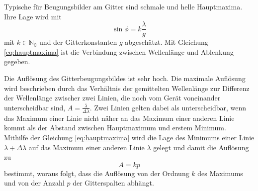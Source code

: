 Typische für Beugungsbilder am Gitter sind schmale und helle Hauptmaxima.
Ihre Lage wird mit 
\begin{equation}
	\sin{\phi}= k\frac{\lambda}{g} 
	\label{eq:hauptmaxima}
\end{equation}
mit $k\in\mathbb{N_0}$ und der Gitterkonstanten $g$ abgeschätzt.
Mit Gleichung \eqref{eq:hauptmaxima} ist die Verbindung zwischen Wellenlänge und Ablenkung gegeben.

Die Auflösung des Gitterbeugungsbildes ist sehr hoch.
Die maximale Auflösung wird beschrieben durch das Verhältnis der gemittelten Wellenlänge zur Differenz der Wellenlänge
zwischer zwei Linien, die noch vom Gerät voneinander unterscheidbar sind, $A=\frac{\bar\lambda}{\Delta\lambda}$.
Zwei Linien gelten dabei als unterscheidbar, wenn das Maximum einer Linie nicht näher an das Maximum einer anderen Linie kommt als der Abstand zwischen Hauptmaximum und erstem Minimum.\\
Mithilfe der Gleichung \eqref{eq:hauptmaxima} wird die Lage des Minimums einer Linie $\lambda+\Delta\lambda$ auf das Maximum einer anderen Linie $\lambda$ gelegt und damit die Auflösung zu
\begin{equation}
	A=kp
\end{equation}
bestimmt, woraus folgt, dass die Auflösung von der Ordnung $k$ des Maximums und von der Anzahl $p$ der Gitterspalten abhängt.